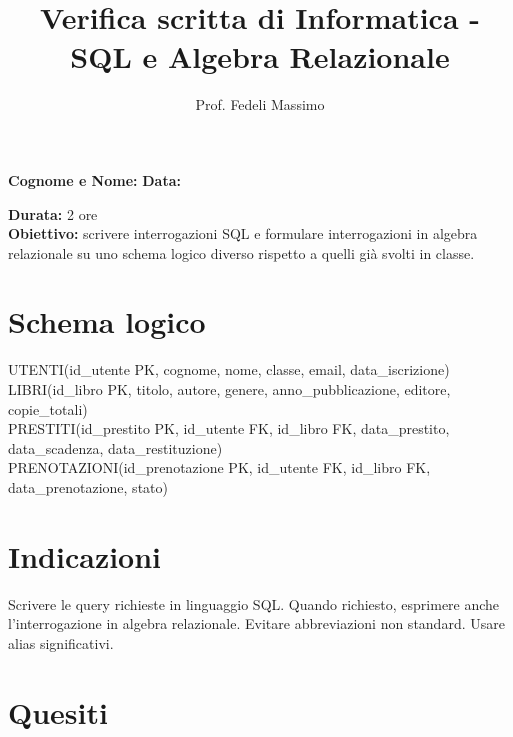\documentclass[a4paper,12pt]{article}
\title{Verifica scritta di Informatica - SQL e Algebra Relazionale}
\author{Prof. Fedeli Massimo}
\date{}
\begin{document}
	\maketitle
	
	\textbf{Cognome e Nome:} \underline{\hspace{8cm}} \hfill
	\textbf{Data:} \underline{\hspace{3cm}}
	
	\vspace{0.5cm}
	
	\textbf{Durata:} 2 ore \\
	\textbf{Obiettivo:} scrivere interrogazioni SQL e formulare interrogazioni in algebra relazionale su uno schema logico diverso rispetto a quelli già svolti in classe.
	
	\section*{Schema logico}
	
	\begin{flushleft}
		UTENTI(id\_utente PK, cognome, nome, classe, email, data\_iscrizione) \\
		LIBRI(id\_libro PK, titolo, autore, genere, anno\_pubblicazione, editore, copie\_totali) \\
		PRESTITI(id\_prestito PK, id\_utente FK, id\_libro FK, data\_prestito, data\_scadenza, data\_restituzione) \\
		PRENOTAZIONI(id\_prenotazione PK, id\_utente FK, id\_libro FK, data\_prenotazione, stato)
	\end{flushleft}
	
	\section*{Indicazioni}
	
	Scrivere le query richieste in linguaggio SQL. Quando richiesto, esprimere anche l'interrogazione in algebra relazionale. Evitare abbreviazioni non standard. Usare alias significativi.
	
	\section*{Quesiti}
	
\end{document}
